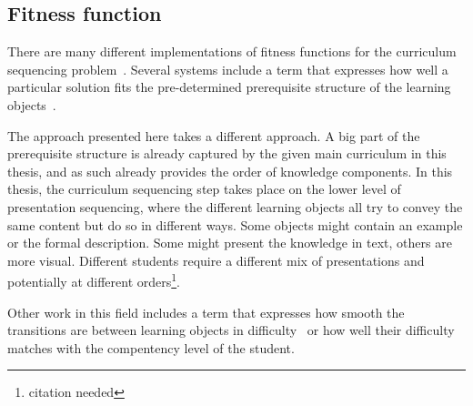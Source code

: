 \subsection{Fitness function}
There are many different implementations of fitness functions for the
curriculum sequencing problem~\citep{AlMuhaideb2011}.
Several systems include a term that expresses how
well a particular solution fits the pre-determined prerequisite structure of
the learning objects~\citep{Seki2005, Chen2009, Samia2007}.

The approach presented here takes a different
approach. A big part of the prerequisite structure is already captured by the
given main curriculum in this thesis, and as such already provides the order of
knowledge components. In this thesis, the curriculum sequencing step takes place
on the lower level of presentation sequencing, where the different learning
objects all try to convey the same content but do so in different
ways. Some objects might contain an example or the formal description. Some
might present the knowledge in text, others are more visual. Different students
require a different mix of presentations and potentially at different
orders\footnote{citation needed}.

Other work in this field includes a term that expresses how smooth the
transitions are between learning objects in difficulty~\citep{Hovakimyan2004,
Seki2005, Chen2008, Huang2007} or how well their difficulty matches with the
compentency level of the student\citep{Seki2005, Chen2008, Chen2009, Samia2007, Huang2007}.


